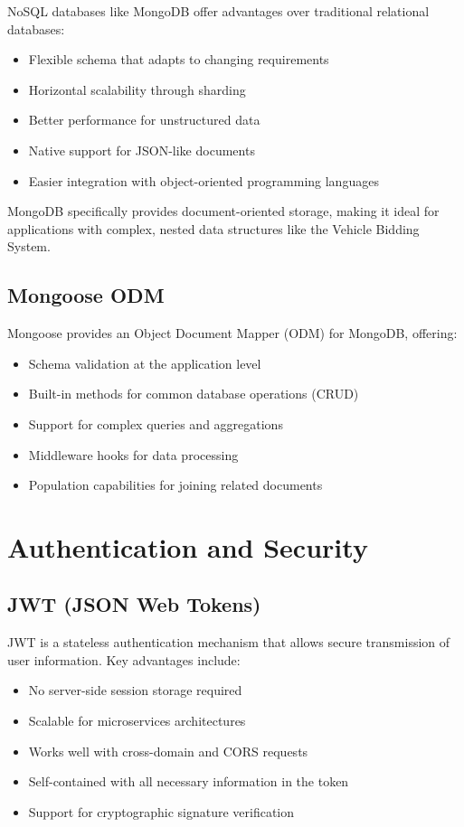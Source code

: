 NoSQL databases like MongoDB offer advantages over traditional relational databases:

\begin{itemize}
    \item Flexible schema that adapts to changing requirements
    \item Horizontal scalability through sharding
    \item Better performance for unstructured data
    \item Native support for JSON-like documents
    \item Easier integration with object-oriented programming languages
\end{itemize}

MongoDB specifically provides document-oriented storage, making it ideal for applications with complex, nested data structures like the Vehicle Bidding System.

\subsection{Mongoose ODM}

Mongoose provides an Object Document Mapper (ODM) for MongoDB, offering:

\begin{itemize}
    \item Schema validation at the application level
    \item Built-in methods for common database operations (CRUD)
    \item Support for complex queries and aggregations
    \item Middleware hooks for data processing
    \item Population capabilities for joining related documents
\end{itemize}

\section{Authentication and Security}

\subsection{JWT (JSON Web Tokens)}

JWT is a stateless authentication mechanism that allows secure transmission of user information. Key advantages include:

\begin{itemize}
    \item No server-side session storage required
    \item Scalable for microservices architectures
    \item Works well with cross-domain and CORS requests
    \item Self-contained with all necessary information in the token
    \item Support for cryptographic signature verification
\end{itemize}

